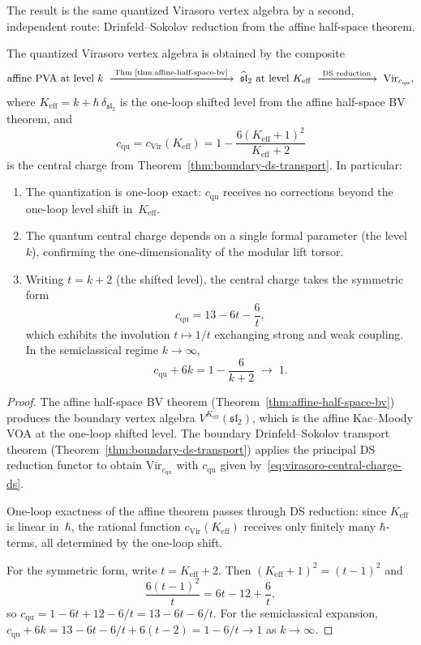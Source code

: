 The result is the same quantized Virasoro vertex algebra by a second,
independent route: Drinfeld--Sokolov reduction from the affine half-space
theorem.

\begin{theorem}
\label{thm:virasoro-quantization-ds}
The quantized Virasoro vertex algebra is obtained by the composite
\[
\text{affine PVA at level }k
\;\xrightarrow{\;\text{Thm~\ref{thm:affine-half-space-bv}}\;}
\;\widehat{\mathfrak{sl}}_2\text{ at level }K_{\mathrm{eff}}
\;\xrightarrow{\;\text{DS reduction}\;}
\;\mathrm{Vir}_{c_{\mathrm{qu}}},
\]
where $K_{\mathrm{eff}} = k + \hbar\,\delta_{\mathfrak{sl}_2}$ is the
one-loop shifted level from the affine half-space BV theorem, and
\begin{equation}\label{eq:virasoro-central-charge-ds}
c_{\mathrm{qu}} = c_{\mathrm{Vir}}(K_{\mathrm{eff}})
= 1 - \frac{6(K_{\mathrm{eff}}+1)^2}{K_{\mathrm{eff}}+2}
\end{equation}
is the central charge from
Theorem~\textup{\ref{thm:boundary-ds-transport}}.
In particular:
\begin{enumerate}[leftmargin=2.4em]
\item The quantization is one-loop exact: $c_{\mathrm{qu}}$ receives
no corrections beyond the one-loop level shift in~$K_{\mathrm{eff}}$.
\item The quantum central charge depends on a single formal parameter
(the level~$k$), confirming the one-dimensionality of the modular lift
torsor.
\item Writing $t = k+2$ (the shifted level), the central charge
takes the symmetric form
\[
c_{\mathrm{qu}} = 13 - 6t - \frac{6}{t},
\]
which exhibits the involution $t\mapsto 1/t$ exchanging strong and
weak coupling. In the semiclassical regime $k\to\infty$,
\[
c_{\mathrm{qu}} + 6k = 1 - \frac{6}{k+2} \;\to\; 1.
\]
\end{enumerate}
\end{theorem}

\begin{proof}
The affine half-space BV theorem
(Theorem~\ref{thm:affine-half-space-bv}) produces the boundary
vertex algebra $V^{K_{\mathrm{eff}}}(\mathfrak{sl}_2)$, which is the
affine Kac--Moody VOA at the one-loop shifted level. The boundary
Drinfeld--Sokolov transport theorem
(Theorem~\ref{thm:boundary-ds-transport}) applies the principal DS
reduction functor to obtain $\mathrm{Vir}_{c_{\mathrm{qu}}}$ with
$c_{\mathrm{qu}}$ given by~\eqref{eq:virasoro-central-charge-ds}.

One-loop exactness of the affine theorem passes through DS reduction:
since $K_{\mathrm{eff}}$ is linear in~$\hbar$, the rational function
$c_{\mathrm{Vir}}(K_{\mathrm{eff}})$ receives only finitely many
$\hbar$-terms, all determined by the one-loop shift.

For the symmetric form, write $t = K_{\mathrm{eff}} + 2$. Then
$(K_{\mathrm{eff}}+1)^2 = (t-1)^2$ and
\[
\frac{6(t-1)^2}{t} = 6t - 12 + \frac{6}{t},
\]
so $c_{\mathrm{qu}} = 1 - 6t + 12 - 6/t = 13 - 6t - 6/t$. For the
semiclassical expansion, $c_{\mathrm{qu}} + 6k
= 13 - 6t - 6/t + 6(t-2) = 1 - 6/t \to 1$ as $k\to\infty$.
\end{proof}

